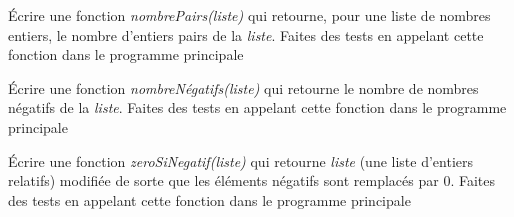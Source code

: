 \begin{Exercise}[title={ Nombre de pairs}]
\Question Écrire une fonction  \textit{nombrePairs(liste)} qui retourne, pour une liste de nombres entiers, le nombre d'entiers pairs de la  \textit{liste}.
\Question Faites des tests en appelant cette fonction dans le programme principale
\end{Exercise}

\begin{Exercise}[title={Nombre de négatifs}]
\Question Écrire une fonction  \textit{nombreNégatifs(liste)} qui retourne le nombre de nombres négatifs de la  \textit{liste}.
\Question Faites des tests en appelant cette fonction dans le programme principale
\end{Exercise}

\begin{Exercise}[title={Transformation}]
\Question Écrire une fonction  \textit{zeroSiNegatif(liste)} qui retourne  \textit{liste} (une liste d'entiers relatifs) modifiée de sorte que les éléments négatifs sont remplacés par 0. 
\Question Faites des tests en appelant cette fonction dans le programme principale
\end{Exercise}